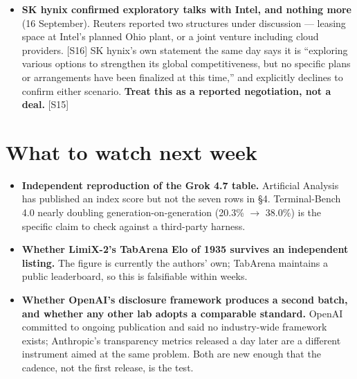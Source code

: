 \documentclass[11pt,a4paper]{article}
\newcommand{\srcref}[1]{\textcolor{brandaccent}{[S#1]}}
\begin{document}
\begin{itemize}
        is non-exclusive and Anthropic says it is in discussion with nonprofit
        evaluators including METR. \srcref{14}
  \item \textbf{SK hynix confirmed exploratory talks with Intel, and nothing more}
        (16 September). Reuters reported two structures under discussion --- leasing
        space at Intel's planned Ohio plant, or a joint venture including cloud
        providers. \srcref{16} SK hynix's own statement the same day says it is
        ``exploring various options to strengthen its global competitiveness, but no
        specific plans or arrangements have been finalized at this time,'' and
        explicitly declines to confirm either scenario. \textbf{Treat this as a
        reported negotiation, not a deal.} \srcref{15}
\end{itemize}

\section{What to watch next week}
\begin{itemize}
  \item \textbf{Independent reproduction of the Grok 4.7 table.} Artificial Analysis
        has published an index score but not the seven rows in \S4. Terminal-Bench
        4.0 nearly doubling generation-on-generation (20.3\% $\to$ 38.0\%) is the
        specific claim to check against a third-party harness.
  \item \textbf{Whether LimiX-2's TabArena Elo of 1935 survives an independent
        listing.} The figure is currently the authors' own; TabArena maintains a
        public leaderboard, so this is falsifiable within weeks.
  \item \textbf{Whether OpenAI's disclosure framework produces a second batch, and
        whether any other lab adopts a comparable standard.} OpenAI committed to
        ongoing publication and said no industry-wide framework exists; Anthropic's
        transparency metrics released a day later are a different instrument aimed at
        the same problem. Both are new enough that the cadence, not the first
        release, is the test.
\end{itemize}

\end{document}
